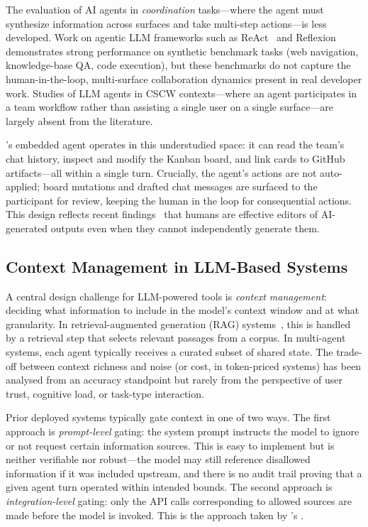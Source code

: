 The evaluation of AI agents in \emph{coordination} tasks---where the agent must
synthesize information across surfaces and take multi-step actions---is less
developed. Work on agentic LLM frameworks such as ReAct~\cite{yao2023react} and
Reflexion~\cite{shinn2023reflexion} demonstrates strong performance on synthetic
benchmark tasks (web navigation, knowledge-base QA, code execution), but these
benchmarks do not capture the human-in-the-loop, multi-surface collaboration
dynamics present in real developer work. Studies of LLM agents in CSCW
contexts---where an agent participates in a team workflow rather than assisting a
single user on a single surface---are largely absent from the literature.

\Weld's embedded agent operates in this understudied space: it can read the
team's chat history, inspect and modify the Kanban board, and link cards to
GitHub artifacts---all within a single turn. Crucially, the agent's actions are
not auto-applied; board mutations and drafted chat messages are surfaced to the
participant for review, keeping the human in the loop for consequential actions.
This design reflects recent findings~\cite{noy2023} that humans are effective
editors of AI-generated outputs even when they cannot independently generate
them.

\subsection{Context Management in LLM-Based Systems}
\label{sec:related:context}

A central design challenge for LLM-powered tools is \emph{context management}:
deciding what information to include in the model's context window and at what
granularity. In retrieval-augmented generation (RAG) systems~\cite{lewis2020rag},
this is handled by a retrieval step that selects relevant passages from a corpus.
In multi-agent systems, each agent typically receives a curated subset of shared
state. The trade-off between context richness and noise (or cost, in
token-priced systems) has been analysed from an accuracy standpoint but rarely
from the perspective of user trust, cognitive load, or task-type interaction.

Prior deployed systems typically gate context in one of two ways. The first
approach is \emph{prompt-level} gating: the system prompt instructs the model
to ignore or not request certain information sources. This is easy to implement
but is neither verifiable nor robust---the model may still reference disallowed
information if it was included upstream, and there is no audit trail proving
that a given agent turn operated within intended bounds. The second approach is
\emph{integration-level} gating: only the API calls corresponding to allowed
sources are made before the model is invoked. This is the approach taken by
\Weld's \ContextGate.

